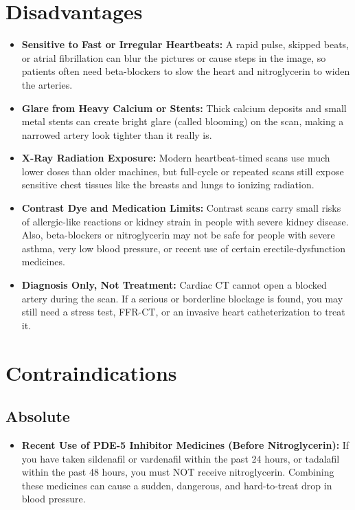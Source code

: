 \section{Disadvantages}
\begin{itemize}
    \item \textbf{Sensitive to Fast or Irregular Heartbeats:} A rapid pulse, skipped beats, or atrial fibrillation can blur the pictures or cause steps in the image, so patients often need beta-blockers to slow the heart and nitroglycerin to widen the arteries.
    \item \textbf{Glare from Heavy Calcium or Stents:} Thick calcium deposits and small metal stents can create bright glare (called blooming) on the scan, making a narrowed artery look tighter than it really is.
    \item \textbf{X-Ray Radiation Exposure:} Modern heartbeat-timed scans use much lower doses than older machines, but full-cycle or repeated scans still expose sensitive chest tissues like the breasts and lungs to ionizing radiation.
    \item \textbf{Contrast Dye and Medication Limits:} Contrast scans carry small risks of allergic-like reactions or kidney strain in people with severe kidney disease. Also, beta-blockers or nitroglycerin may not be safe for people with severe asthma, very low blood pressure, or recent use of certain erectile-dysfunction medicines.
    \item \textbf{Diagnosis Only, Not Treatment:} Cardiac CT cannot open a blocked artery during the scan. If a serious or borderline blockage is found, you may still need a stress test, FFR-CT, or an invasive heart catheterization to treat it.
\end{itemize}

\section{Contraindications}

\subsection{Absolute}
\begin{itemize}
    \item \textbf{Recent Use of PDE-5 Inhibitor Medicines (Before Nitroglycerin):} If you have taken sildenafil or vardenafil within the past 24 hours, or tadalafil within the past 48 hours, you must NOT receive nitroglycerin. Combining these medicines can cause a sudden, dangerous, and hard-to-treat drop in blood pressure.
\end{itemize}

